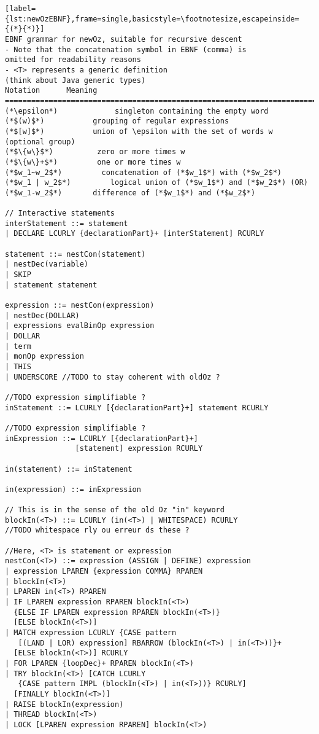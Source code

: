 \begin{lstlisting}[label={lst:newOzEBNF},frame=single,basicstyle=\footnotesize,escapeinside={(*}{*)}]
EBNF grammar for newOz, suitable for recursive descent
- Note that the concatenation symbol in EBNF (comma) is
omitted for readability reasons
- <T> represents a generic definition
(think about Java generic types)
Notation      Meaning
===========================================================================
(*\epsilon*)             singleton containing the empty word
(*$(w)$*)           grouping of regular expressions
(*$[w]$*)           union of \epsilon with the set of words w (optional group)
(*$\{w\}$*)          zero or more times w
(*$\{w\}+$*)         one or more times w
(*$w_1~w_2$*)         concatenation of (*$w_1$*) with (*$w_2$*)
(*$w_1 | w_2$*)         logical union of (*$w_1$*) and (*$w_2$*) (OR)
(*$w_1-w_2$*)       difference of (*$w_1$*) and (*$w_2$*)

// Interactive statements
interStatement ::= statement
| DECLARE LCURLY {declarationPart}+ [interStatement] RCURLY

statement ::= nestCon(statement)
| nestDec(variable)
| SKIP
| statement statement

expression ::= nestCon(expression)
| nestDec(DOLLAR)
| expressions evalBinOp expression
| DOLLAR
| term
| monOp expression
| THIS
| UNDERSCORE //TODO to stay coherent with oldOz ?

//TODO expression simplifiable ?
inStatement ::= LCURLY [{declarationPart}+] statement RCURLY

//TODO expression simplifiable ?
inExpression ::= LCURLY [{declarationPart}+]
                [statement] expression RCURLY

in(statement) ::= inStatement

in(expression) ::= inExpression

// This is in the sense of the old Oz "in" keyword
blockIn(<T>) ::= LCURLY (in(<T>) | WHITESPACE) RCURLY
//TODO whitespace rly ou erreur ds these ?

//Here, <T> is statement or expression
nestCon(<T>) ::= expression (ASSIGN | DEFINE) expression
| expression LPAREN {expression COMMA} RPAREN
| blockIn(<T>)
| LPAREN in(<T>) RPAREN
| IF LPAREN expression RPAREN blockIn(<T>)
  {ELSE IF LPAREN expression RPAREN blockIn(<T>)}
  [ELSE blockIn(<T>)]
| MATCH expression LCURLY {CASE pattern
   [(LAND | LOR) expression] RBARROW (blockIn(<T>) | in(<T>))}+
  [ELSE blockIn(<T>)] RCURLY
| FOR LPAREN {loopDec}+ RPAREN blockIn(<T>)
| TRY blockIn(<T>) [CATCH LCURLY
   {CASE pattern IMPL (blockIn(<T>) | in(<T>))} RCURLY]
  [FINALLY blockIn(<T>)]
| RAISE blockIn(expression)
| THREAD blockIn(<T>)
| LOCK [LPAREN expression RPAREN] blockIn(<T>)


\end{lstlisting}
